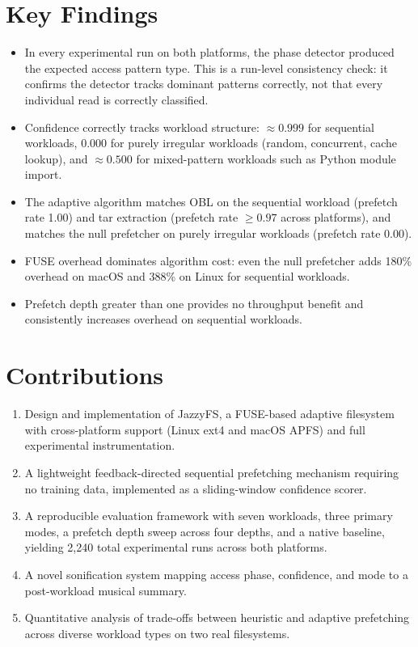 \documentclass[12pt]{report}
\begin{document}
\section{Key Findings}

\begin{itemize}
    \item In every experimental run on both platforms, the phase detector
    produced the expected access pattern type. This is a run-level
    consistency check: it confirms the detector tracks dominant patterns
    correctly, not that every individual read is correctly classified.
    \item Confidence correctly tracks workload structure: $\approx 0.999$ for
    sequential workloads, 0.000 for purely irregular workloads
    (random, concurrent, cache lookup), and $\approx 0.500$ for mixed-pattern
    workloads such as Python module import.
    \item The adaptive algorithm matches OBL on the sequential workload
    (prefetch rate 1.00) and tar extraction (prefetch rate $\geq 0.97$ across
    platforms), and matches the null prefetcher on purely irregular workloads
    (prefetch rate 0.00).
    \item FUSE overhead dominates algorithm cost: even the null prefetcher
    adds 180\% overhead on macOS and 388\% on Linux for sequential workloads.
    \item Prefetch depth greater than one provides no throughput benefit and
    consistently increases overhead on sequential workloads.
\end{itemize}

\section{Contributions}

\begin{enumerate}
    \item Design and implementation of JazzyFS, a FUSE-based adaptive
    filesystem with cross-platform support (Linux ext4 and macOS APFS) and
    full experimental instrumentation.
    \item A lightweight feedback-directed sequential prefetching mechanism
    requiring no training data, implemented as a sliding-window confidence
    scorer.
    \item A reproducible evaluation framework with seven workloads, three
    primary modes, a prefetch depth sweep across four depths, and a native
    baseline, yielding 2{,}240 total experimental runs across both platforms.
    \item A novel sonification system mapping access phase, confidence, and
    mode to a post-workload musical summary.
    \item Quantitative analysis of trade-offs between heuristic and adaptive
    prefetching across diverse workload types on two real filesystems.
\end{enumerate}
\end{document}
